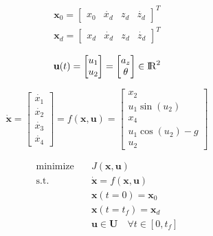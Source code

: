 \documentclass[letterpaper, 10 pt, conference]{ieeeconf}
\begin{document}
\begin{equation}
  \begin{split}
    \textbf{x}_{0} = \begin{bmatrix}
        x_{0} & \dot{x_{d}} & z_{d} & \dot{z_{d}}
    \end{bmatrix}^{T} \\
    \textbf{x}_{d} = \begin{bmatrix}
        x_{d} & \dot{x_{d}} & z_{d} & \dot{z_{d}}
    \end{bmatrix}^{T}
  \end{split}
\end{equation}

\begin{equation}
  \textbf{u}(t)
    = \begin{bmatrix} u_{1} \\ u_{2} \end{bmatrix}
    = \begin{bmatrix} a_{z} \\ \theta \end{bmatrix}
    \in {\rm I\!R}^{2}
\end{equation}

\begin{equation}
  \dot{\textbf{x}} =
    \begin{bmatrix}
      \dot{x_{1}} \\ \dot{x_{2}} \\ \dot{x_{3}} \\ \dot{x_{4}}
    \end{bmatrix} =
    f(\textbf{x}, \textbf{u}) =
    \begin{bmatrix}
      x_{2} \\
      u_{1} \sin(u_{2}) \\
      x_{4} \\
      u_{1} \cos(u_{2}) - g \\
      u_{2}
    \end{bmatrix}
\end{equation}

\begin{align} 
  \text{minimize} \quad &J(\textbf{x}, \textbf{u}) \\
  \text{s.t.} \quad & \dot{\textbf{x}} = f(\textbf{x}, \textbf{u}) \\
    & \textbf{x}(t = 0) = \textbf{x}_{0} \\
    & \textbf{x}(t = t_{f}) = \textbf{x}_{d} \\
    & \textbf{u} \in \textbf{U} \quad \forall t \in [0, t_{f}]
\end{align}
\end{document}

